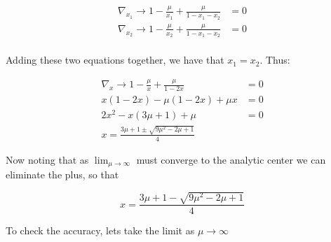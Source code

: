 \documentclass{article} %
\begin{document}
\begin{itemize}
\begin{equation*}
\begin{aligned}
\nabla_{x_1} \rightarrow 1 - \frac{\mu}{x_1} + \frac{\mu}{1 - x_1 - x_2} &= 0 \\ 
\nabla_{x_2} \rightarrow 1 - \frac{\mu}{x_2} + \frac{\mu}{1 - x_1 - x_2} &= 0 \\
\end{aligned}
\end{equation*}

Adding these two equations together, we have that $x_1 = x_2$. Thus:

\begin{equation*}
\begin{aligned}
\nabla_x \rightarrow 1 - \frac{\mu}{x} + \frac{\mu}{1 - 2x} &= 0 \\ 
x(1 - 2x) - \mu(1 - 2x) + \mu x &= 0 \\ 
2x^2 - x( 3 \mu + 1) + \mu &= 0\\ 
x = \frac{3 \mu + 1 \pm \sqrt{9\mu^2 -2  \mu + 1}} { 4} 
\end{aligned}
\end{equation*}

Now noting that as $\lim_{\mu \to \infty}$ must converge to the analytic center we can eliminate the plus, so that 

\[
x = \frac{3 \mu + 1 -  \sqrt{9\mu^2 -2  \mu + 1}} { 4} 
\]

To check the accuracy, lets take the limit as $\mu \to \infty$


\end{itemize}
\end{document}

